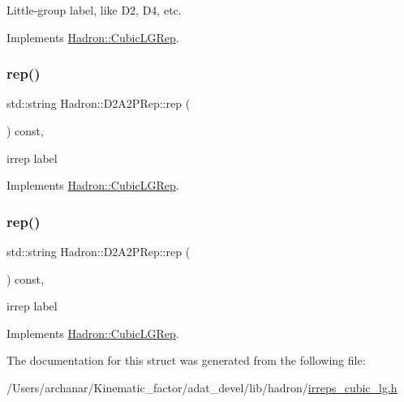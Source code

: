 Little-\/group label, like D2, D4, etc. 

Implements \mbox{\hyperlink{structHadron_1_1CubicLGRep_a9bdb14b519a611d21379ed96a3a9eb41}{Hadron\+::\+Cubic\+L\+G\+Rep}}.

\mbox{\label{structHadron_1_1D2A2PRep_a6138d8ba45477135957914c53d06a44e}} 
\subsubsection{\texorpdfstring{rep()}{rep()}\hspace{0.1cm}{\footnotesize\ttfamily [1/2]}}
{\footnotesize\ttfamily std\+::string Hadron\+::\+D2\+A2\+P\+Rep\+::rep (\begin{DoxyParamCaption}{ }\end{DoxyParamCaption}) const\hspace{0.3cm}{\ttfamily [inline]}, {\ttfamily [virtual]}}

irrep label 

Implements \mbox{\hyperlink{structHadron_1_1CubicLGRep_a50f5ddbb8f4be4cee0106fa9e8c75e6c}{Hadron\+::\+Cubic\+L\+G\+Rep}}.

\mbox{\label{structHadron_1_1D2A2PRep_a6138d8ba45477135957914c53d06a44e}} 
\subsubsection{\texorpdfstring{rep()}{rep()}\hspace{0.1cm}{\footnotesize\ttfamily [2/2]}}
{\footnotesize\ttfamily std\+::string Hadron\+::\+D2\+A2\+P\+Rep\+::rep (\begin{DoxyParamCaption}{ }\end{DoxyParamCaption}) const\hspace{0.3cm}{\ttfamily [inline]}, {\ttfamily [virtual]}}

irrep label 

Implements \mbox{\hyperlink{structHadron_1_1CubicLGRep_a50f5ddbb8f4be4cee0106fa9e8c75e6c}{Hadron\+::\+Cubic\+L\+G\+Rep}}.



The documentation for this struct was generated from the following file\+:\begin{DoxyCompactItemize}
\item 
/\+Users/archanar/\+Kinematic\+\_\+factor/adat\+\_\+devel/lib/hadron/\mbox{\hyperlink{lib_2hadron_2irreps__cubic__lg_8h}{irreps\+\_\+cubic\+\_\+lg.\+h}}\end{DoxyCompactItemize}
